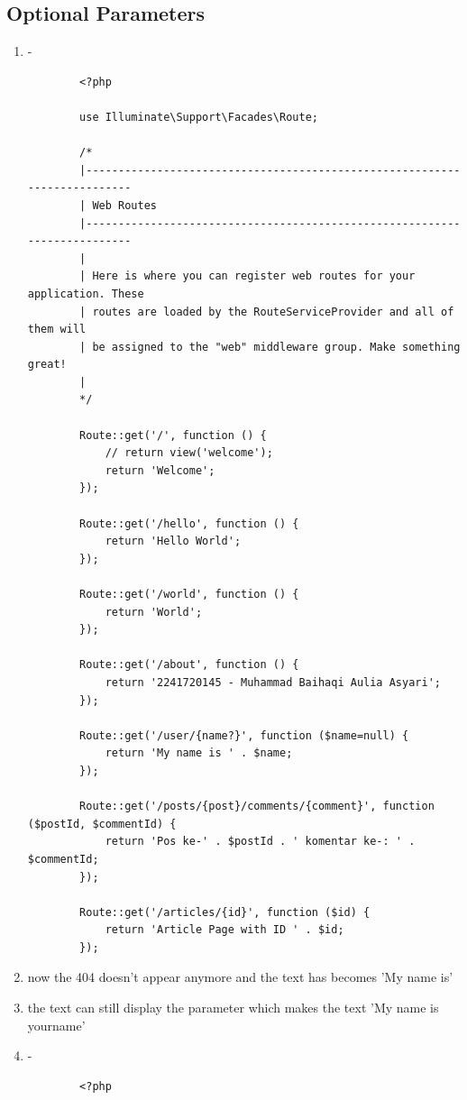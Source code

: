 \documentclass[12pt,titlepage]{article}
\begin{document}
\subsection{Optional Parameters}
\begin{enumerate}[label=\alph*.]
    \item -
    \begin{verbatim}
        <?php

        use Illuminate\Support\Facades\Route;
        
        /*
        |--------------------------------------------------------------------------
        | Web Routes
        |--------------------------------------------------------------------------
        |
        | Here is where you can register web routes for your application. These
        | routes are loaded by the RouteServiceProvider and all of them will
        | be assigned to the "web" middleware group. Make something great!
        |
        */
        
        Route::get('/', function () {
            // return view('welcome');
            return 'Welcome';
        });
        
        Route::get('/hello', function () {
            return 'Hello World';
        });
        
        Route::get('/world', function () {
            return 'World';
        }); 
        
        Route::get('/about', function () {
            return '2241720145 - Muhammad Baihaqi Aulia Asyari';
        }); 
        
        Route::get('/user/{name?}', function ($name=null) {
            return 'My name is ' . $name;
        }); 
        
        Route::get('/posts/{post}/comments/{comment}', function ($postId, $commentId) {
            return 'Pos ke-' . $postId . ' komentar ke-: ' . $commentId;
        });
        
        Route::get('/articles/{id}', function ($id) {
            return 'Article Page with ID ' . $id;
        });      
    \end{verbatim}
    \item now the 404 doesn't appear anymore and the text has becomes 'My name is'
    \item the text can still display the parameter which makes the text 'My name is yourname'
    \item -
    \begin{verbatim}
        <?php


\end{verbatim}
\end{enumerate}
\end{document}
